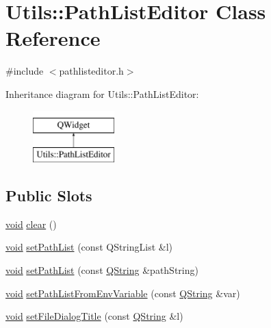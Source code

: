 \hypertarget{class_utils_1_1_path_list_editor}{\section{Utils\-:\-:Path\-List\-Editor Class Reference}
\label{class_utils_1_1_path_list_editor}
}


{\ttfamily \#include $<$pathlisteditor.\-h$>$}

Inheritance diagram for Utils\-:\-:Path\-List\-Editor\-:\begin{figure}[H]
\begin{center}
\leavevmode
\includegraphics[height=2.000000cm]{class_utils_1_1_path_list_editor}
\end{center}
\end{figure}
\subsection*{Public Slots}
\begin{DoxyCompactItemize}
\item 
\hyperlink{group___u_a_v_objects_plugin_ga444cf2ff3f0ecbe028adce838d373f5c}{void} \hyperlink{class_utils_1_1_path_list_editor_af6cfc8d39c245493fe352dcb05e7fafc}{clear} ()
\item 
\hyperlink{group___u_a_v_objects_plugin_ga444cf2ff3f0ecbe028adce838d373f5c}{void} \hyperlink{class_utils_1_1_path_list_editor_a18015673d52b80b875628c2b66d4db24}{set\-Path\-List} (const Q\-String\-List \&l)
\item 
\hyperlink{group___u_a_v_objects_plugin_ga444cf2ff3f0ecbe028adce838d373f5c}{void} \hyperlink{class_utils_1_1_path_list_editor_aed361e69b7808c9e39a3c11d00feda03}{set\-Path\-List} (const \hyperlink{group___u_a_v_objects_plugin_gab9d252f49c333c94a72f97ce3105a32d}{Q\-String} \&path\-String)
\item 
\hyperlink{group___u_a_v_objects_plugin_ga444cf2ff3f0ecbe028adce838d373f5c}{void} \hyperlink{class_utils_1_1_path_list_editor_a5126b279700cc6799220c53681ccc5fa}{set\-Path\-List\-From\-Env\-Variable} (const \hyperlink{group___u_a_v_objects_plugin_gab9d252f49c333c94a72f97ce3105a32d}{Q\-String} \&var)
\item 
\hyperlink{group___u_a_v_objects_plugin_ga444cf2ff3f0ecbe028adce838d373f5c}{void} \hyperlink{class_utils_1_1_path_list_editor_ac6942cbe78b6f8df818f21ed565e347c}{set\-File\-Dialog\-Title} (const \hyperlink{group___u_a_v_objects_plugin_gab9d252f49c333c94a72f97ce3105a32d}{Q\-String} \&l)
\end{DoxyCompactItemize}
